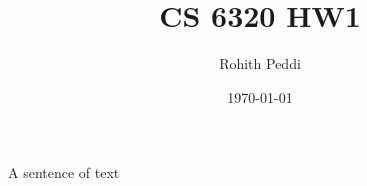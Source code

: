\documentclass[a4paper,12pt]{article}
\begin{document}
\title{CS 6320 HW1}
\author{Rohith Peddi}
\date{\today}
\maketitle

A sentence of text
\end{document}
